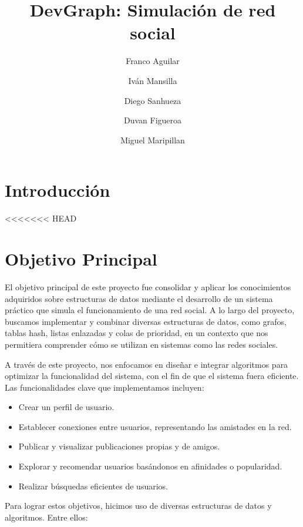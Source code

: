 \documentclass[9pt,letterpaper,onecolumn]{rho-class/rho}
\title{DevGraph: Simulación de red social}
\author[$\dagger$]{Franco Aguilar}
\author[$\dagger$]{Iván Mansilla}
\author[$\dagger$]{Diego Sanhueza}
\author[$\dagger$]{Duvan Figueroa}
\author[$\dagger$]{Miguel Maripillan}
\affil[$\dagger$]{Universidad de Magallanes}
\begin{document}
	
    \maketitle
    \thispagestyle{firststyle}
    \tableofcontents


\newpage
\section{Introducción}

<<<<<<< HEAD

\section{Objetivo Principal}

El objetivo principal de este proyecto fue consolidar y aplicar los conocimientos adquiridos sobre estructuras de datos mediante el desarrollo de un sistema práctico que simula el funcionamiento de una red social. A lo largo del proyecto, buscamos implementar y combinar diversas estructuras de datos, como grafos, tablas hash, listas enlazadas y colas de prioridad, en un contexto que nos permitiera comprender cómo se utilizan en sistemas como las redes sociales.

A través de este proyecto, nos enfocamos en diseñar e integrar algoritmos para optimizar la funcionalidad del sistema, con el fin de que el sistema fuera eficiente. Las funcionalidades clave que implementamos incluyen:

\begin{itemize}
    \item Crear un perfil de usuario.
    \item Establecer conexiones entre usuarios, representando las amistades en la red.
    \item Publicar y visualizar publicaciones propias y de amigos.
    \item Explorar y recomendar usuarios basándonos en afinidades o popularidad.
    \item Realizar búsquedas eficientes de usuarios.
\end{itemize}

Para lograr estos objetivos, hicimos uso de diversas estructuras de datos y algoritmos. Entre ellos:
\end{document}
